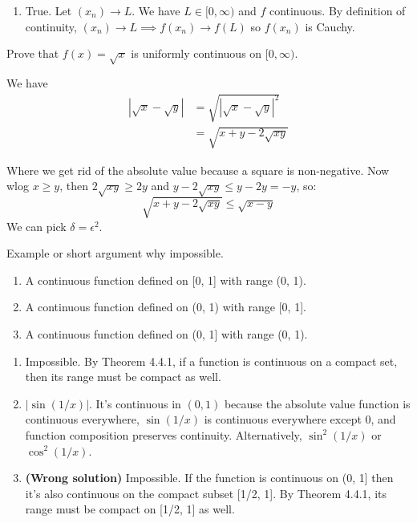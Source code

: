 \documentclass{oxmathproblems}
\begin{document}
\begin{questions}
\begin{solution}
\begin{enumerate}[label=(\alph*)]
    By uniform continuity, there exists a $\delta$ such that $|x_{n}-x_{m}| < \delta \implies |f(x_{n})-f(x_{m})| < \epsilon$.

    Since $(x_{n})$ is Cauchy, there exists an $N$ such that for all $n, m > N$, $|x_{n}-x_{m}| < \delta$.

    So the final chain of logic is: $(x_{n})$ Cauchy $\implies$ pick an $N$ such that $|x_{n}-x_{m}| < \delta \implies$ $|f(x_{n})-f(x_{m})| < \epsilon$ by uniformy continuity.
 
    \item True. Let $(x_{n}) \to L$. We have $L \in [0, \infty)$ and $f$ continuous. By definition of continuity, $(x_{n}) \to L \implies f(x_{n}) \to f(L)$ so $f(x_{n})$ is Cauchy.
  \end{enumerate}
\end{solution}

\miquestion Prove that $f(x) = \sqrt{x}$ is uniformly continuous on $[0, \infty)$.
\begin{solution}
  We have
  \begin{align*}
    |\sqrt{x}-\sqrt{y}| &= \sqrt{|\sqrt{x}-\sqrt{y}|^2} \\
    &=\sqrt{x+y-2\sqrt{xy}}
  \end{align*}

  Where we get rid of the absolute value because a square is non-negative. Now wlog $x \geq y$, then $2\sqrt{xy} \geq 2y$ and $y-2\sqrt{xy} \leq y-2y = -y$, so:
  \[\sqrt{x+y-2\sqrt{xy}} \leq \sqrt{x-y}\]
  We can pick $\delta=\epsilon^{2}$.
\end{solution}

\miquestion Example or short argument why impossible.
\begin{enumerate}[label=(\alph*)]
  \item A continuous function defined on [0, 1] with range (0, 1).
  \item A continuous function defined on (0, 1) with range [0, 1].
  \item A continuous function defined on (0, 1] with range (0, 1).
\end{enumerate}

\begin{solution}
  \begin{enumerate}[label=(\alph*)]
    \item Impossible. By Theorem 4.4.1, if a function is continuous on a compact set, then its range must be compact as well.
    \item $|\sin(1/x)|$. It's continuous in $(0, 1)$ because the absolute value function is continuous everywhere, $\sin(1/x)$ is continuous everywhere except 0, and function composition
    preserves continuity. Alternatively, $\sin^2(1/x)$ or $\cos^2(1/x)$.
    \item \textbf{(Wrong solution)} Impossible. If the function is continuous on (0, 1] then it's also continuous on the compact subset [1/2, 1]. By Theorem 4.4.1, its range must be compact on [1/2, 1] as well.
    

\end{enumerate}
\end{solution}
\end{questions}
\end{document}
